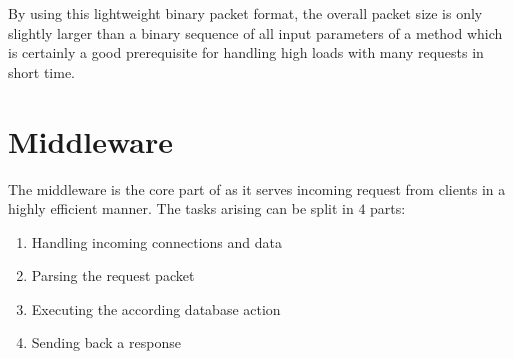 \documentclass[a4paper, oneside]{csthesis}
\begin{document}
\begin{table}[hp]
        \caption{Supported packets in \telesto. By convention an odd {\tt
        method\_id} indicates client to server communication while even values
        are server to client communication. Queue and Message objects in the
        payload include all fields stored in the database (see \cref{sec:db}).
        The {\tt mode} in the ReadMessage packet is used to indicate whether
        the oldest message or the one with the highest priority should be
        served.}
        \label{tbl:packets}
    \end{table}
    
    By using this lightweight binary packet format, the overall packet size is
    only slightly larger than a binary sequence of all input parameters of a
    method which is certainly a good prerequisite for handling high loads with
    many requests in short time. 


\section{Middleware}

    The middleware is the core part of \telesto{} as it serves incoming request
    from clients in a highly efficient manner. The tasks arising can be split in
    $4$ parts:
    
    \begin{enumerate}
        \item Handling incoming connections and data
        \item Parsing the request packet
        \item Executing the according database action
        \item Sending back a response
    \end{enumerate}
\end{document}
